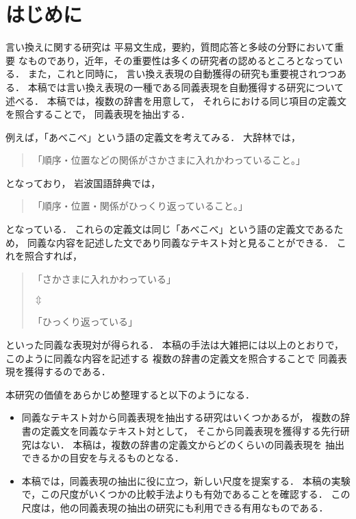 

\maketitle


\section{はじめに}

言い換えに関する研究\cite{sato_ronbun_iikae,murata_paraphrase_true,inui_iikae_tutorial,murata_paraphrase_nlp2004}は
平易文生成，要約，質問応答\cite{murata2000_1_nl,murata_qa_ieice_kaisetu}と多岐の分野において重要
なものであり，近年，その重要性は多くの研究者の認めるところとなっている．
また，これと同時に，
言い換え表現の自動獲得の研究も重要視されつつある．
本稿では言い換え表現の一種である同義表現を自動獲得する研究について述べる．
本稿では，複数の辞書を用意して，
それらにおける同じ項目の定義文を照合することで，
同義表現を抽出する．

例えば，「あべこべ」という語の定義文を考えてみる．
大辞林では，
\begin{quote}
  「順序・位置などの関係がさかさまに入れかわっていること。」  
\end{quote}
となっており，
岩波国語辞典では，
\begin{quote}
  「順序・位置・関係がひっくり返っていること。」
\end{quote}
となっている．
これらの定義文は同じ「あべこべ」という語の定義文であるため，
同義な内容を記述した文であり同義なテキスト対と見ることができる．
これを照合すれば，
\begin{quote}
  「さかさまに入れかわっている」
  
  \hspace*{1cm} $\Updownarrow$ 

  「ひっくり返っている」
\end{quote}
といった同義な表現対が得られる．
本稿の手法は大雑把には以上のとおりで，
このように同義な内容を記述する
複数の辞書の定義文を照合することで
同義表現を獲得するのである．

本研究の価値をあらかじめ整理すると以下のようになる．
\begin{itemize}
\item 
  同義なテキスト対から同義表現を抽出する研究はいくつかあるが，
  複数の辞書の定義文を同義なテキスト対として，
  そこから同義表現を獲得する先行研究はない．
  本稿は，複数の辞書の定義文からどのくらいの同義表現を
  抽出できるかの目安を与えるものとなる．

\item 
  本稿では，同義表現の抽出に役に立つ，新しい尺度を提案する．
  本稿の実験で，この尺度がいくつかの比較手法よりも有効であることを確認する．
  この尺度は，他の同義表現の抽出の研究にも利用できる有用なものである．

\end{itemize}

